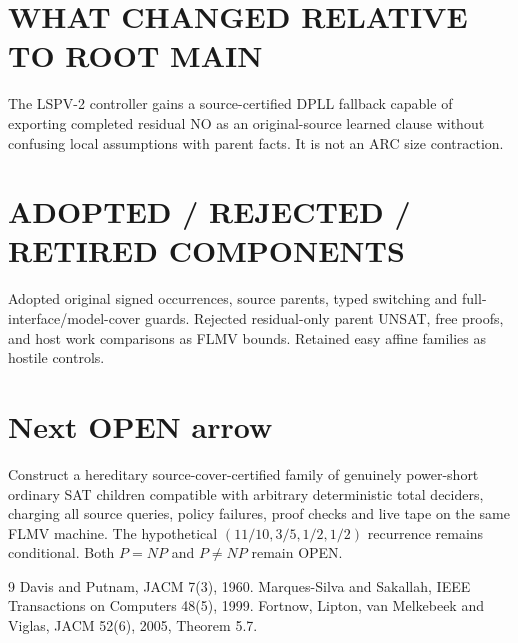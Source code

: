 \documentclass[11pt]{article}
\begin{document}
\section{WHAT CHANGED RELATIVE TO ROOT MAIN}
The LSPV-2 controller gains a source-certified DPLL fallback capable of exporting completed residual NO as an original-source learned clause without confusing local assumptions with parent facts. It is not an ARC size contraction.
\section{ADOPTED / REJECTED / RETIRED COMPONENTS}
Adopted original signed occurrences, source parents, typed switching and full-interface/model-cover guards. Rejected residual-only parent UNSAT, free proofs, and host work comparisons as FLMV bounds. Retained easy affine families as hostile controls.
\section{Next OPEN arrow}
Construct a hereditary source-cover-certified family of genuinely power-short ordinary SAT children compatible with arbitrary deterministic total deciders, charging all source queries, policy failures, proof checks and live tape on the same FLMV machine. The hypothetical $(11/10,3/5,1/2,1/2)$ recurrence remains conditional. Both $P=NP$ and $P\ne NP$ remain OPEN.
\begin{thebibliography}{9}
 Davis and Putnam, JACM 7(3), 1960.
 Marques-Silva and Sakallah, IEEE Transactions on Computers 48(5), 1999.
 Fortnow, Lipton, van Melkebeek and Viglas, JACM 52(6), 2005, Theorem 5.7.
\end{thebibliography}
\end{document}
